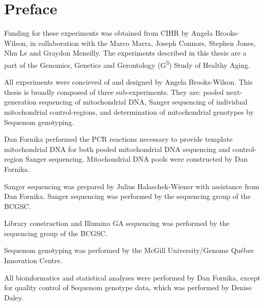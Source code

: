 \chapter{Preface}

Funding for these experiments was obtained from \ac{CIHR} by Angela Brooks-Wilson, in collaboration with the Marco Marra, Joseph Connors, Stephen Jones, Nhu Le and Graydon Meneilly.  The experiments described in this thesis are a part of the Genomics, Genetics and Gerontology (G\textsuperscript{3}) Study of Healthy Aging.

All experiments were concieved of and designed by Angela Brooks-Wilson.  This thesis is broadly composed of three sub-experiments.  They are: pooled next-generation sequencing of mitochondrial DNA, Sanger sequencing of individual mitochondrial control-regions, and determination of mitochondrial genotypes by Sequenom genotyping.

Dan Fornika performed the \ac{PCR} reactions necessary to provide template mitochondrial DNA for both pooled mitochondrial DNA sequencing and control-region Sanger sequencing.  Mitochondrial DNA pools were constructed by Dan Fornika.

Sanger sequencing was prepared by Julius Halaschek-Wiener with assistance from Dan Fornika.  Sanger sequencing was performed by the sequencing group of the \ac{BCGSC}.

Library construction and Illumina \ac{GA} sequencing was performed by the sequencing group of the \ac{BCGSC}.

Sequenom genotyping was performed by the McGill University/Genome Qu\'{e}bec Innovation Centre.

All bioinformatics and statistical analyses were performed by Dan Fornika, except for quality control of Sequenom genotype data, which was performed by Denise Daley.
